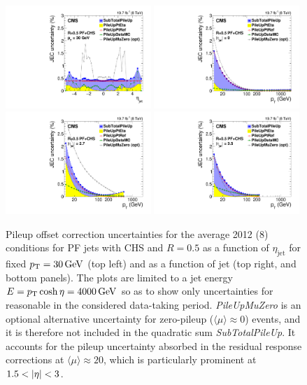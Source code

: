 \documentclass[11pt,twoside,a4paper,cmspaper,final,collab]{cms-tdr}
\begin{document}
\begin{figure}[htbp!]
\centering
\includegraphics[width=0.49\textwidth]{Figure_008-a.pdf}
\includegraphics[width=0.49\textwidth]{Figure_008-b.pdf}
\includegraphics[width=0.49\textwidth]{Figure_008-c.pdf}
\includegraphics[width=0.49\textwidth]{Figure_008-d.pdf}
\caption{\label{fig:l1sys}
Pileup offset correction uncertainties for the average 2012 (8\TeV) conditions for PF jets with CHS and $R=0.5$ as a function of $\eta_\text{jet}$ for fixed $p_{\mathrm{T}}=30\,\text{Ge\hspace{-.08em}V}$ (top left) and as a function of jet \pt (top right, and bottom panels). The plots are limited to a jet energy $E=p_{\mathrm{T}}\cosh\eta=4000\,\text{Ge\hspace{-.08em}V}$ so as to show only uncertainties for reasonable \pt in the considered data-taking period.
\textit{PileUpMuZero} is an optional alternative uncertainty for zero-pileup ($\langle\mu\rangle\approx 0$) events, and it is therefore not included in the quadratic sum \textit{SubTotalPileUp}. It accounts for the pileup uncertainty absorbed in the residual response corrections at $\langle\mu\rangle\approx 20$, which is particularly prominent at $1.5<\lvert \eta \rvert<3$.
}
\end{figure}
\end{document}
